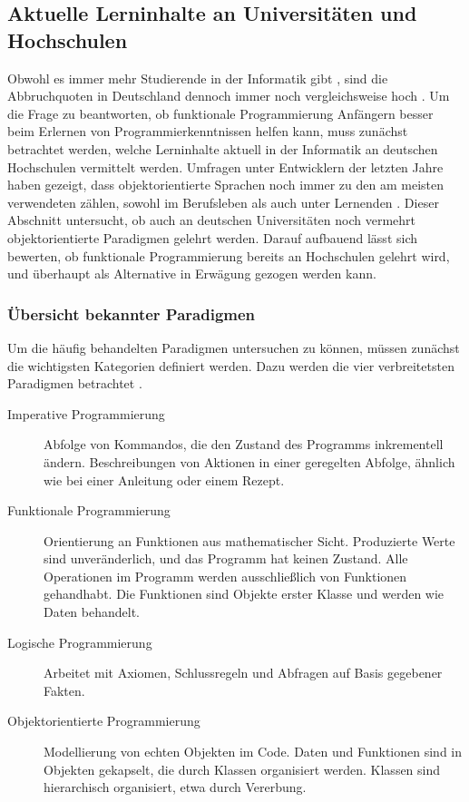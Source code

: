 \subsection{Aktuelle Lerninhalte an Universitäten und Hochschulen}
Obwohl es immer mehr Studierende in der Informatik gibt \cite{destatis}, sind die Abbruchquoten in Deutschland dennoch immer noch vergleichsweise hoch \cite{dhzw}. Um die Frage zu beantworten, ob funktionale Programmierung Anfängern besser beim Erlernen von Programmierkenntnissen helfen kann, muss zunächst betrachtet werden, welche Lerninhalte aktuell in der Informatik an deutschen Hochschulen vermittelt werden.
Umfragen unter Entwicklern der letzten Jahre haben gezeigt, dass objektorientierte Sprachen noch immer zu den am meisten verwendeten zählen, sowohl im Berufsleben als auch unter Lernenden \cite{stackoverflow}. Dieser Abschnitt untersucht, ob auch an deutschen Universitäten noch vermehrt objektorientierte Paradigmen gelehrt werden.
Darauf aufbauend lässt sich bewerten, ob funktionale Programmierung bereits an Hochschulen gelehrt wird, und überhaupt als Alternative in Erwägung gezogen werden kann.

\subsubsection{Übersicht bekannter Paradigmen}
Um die häufig behandelten Paradigmen untersuchen zu können, müssen zunächst die wichtigsten Kategorien definiert werden. Dazu werden die vier verbreitetsten Paradigmen betrachtet \cite{normark}.

\begin{description}
    \item[Imperative Programmierung] Abfolge von Kommandos, die den Zustand des Programms inkrementell ändern. Beschreibungen von Aktionen in einer geregelten Abfolge, ähnlich wie bei einer Anleitung oder einem Rezept.
    \item[Funktionale Programmierung] Orientierung an Funktionen aus mathematischer Sicht. Produzierte Werte sind unveränderlich, und das Programm hat keinen Zustand. Alle Operationen im Programm werden ausschließlich von Funktionen gehandhabt. Die Funktionen sind Objekte erster Klasse und werden wie Daten behandelt.
    \item[Logische Programmierung] Arbeitet mit Axiomen, Schlussregeln und Abfragen auf Basis gegebener Fakten.
    \item[Objektorientierte Programmierung] Modellierung von echten Objekten im Code. Daten und Funktionen sind in Objekten gekapselt, die durch Klassen organisiert werden. Klassen sind hierarchisch organisiert, etwa durch Vererbung.
\end{description}

